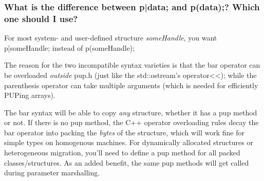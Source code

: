 \subsubsection{What is the difference between \textrm{p|data;} and
\textrm{p(data);}? Which one should I use?}

For most system- and user-defined structure {\em someHandle}, you want
\textrm{p|someHandle;} instead of \textrm{p(someHandle);}

The reason for the two incompatible syntax varieties is that the bar
operator can be overloaded {\em outside} \textrm{pup.h} (just like the
\textrm{std::ostream}'s \textrm{operator{<}<});
while the parenthesis operator can take multiple arguments (which is needed
for efficiently PUPing arrays).

The bar syntax will be able to copy {\em any} structure, whether it
has a pup method or not. If there is no pup method, the C++ operator overloading
rules decay the bar operator into packing the {\em bytes} of the structure,
which will work fine for simple types on homogenous machines. For dynamically
allocated structures or heterogeneous migration, you'll need to define
a pup method for all packed classes/structures. As an added benefit, the
same pup methods will get called during parameter marshalling.
